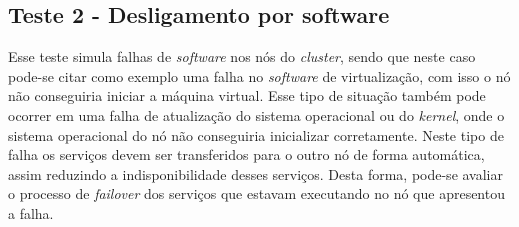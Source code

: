
% 


\subsection{Teste 2 - Desligamento por software}

Esse teste simula falhas de \textit{software} nos nós do \textit{cluster}, sendo que neste caso pode-se citar como exemplo uma falha no 
\textit{software} de virtualização, com isso o nó não conseguiria iniciar a máquina virtual. Esse tipo de situação também pode ocorrer em uma 
falha de atualização do sistema operacional ou do \textit{kernel}, onde o sistema operacional do nó não conseguiria inicializar corretamente.
Neste tipo de falha os serviços devem ser transferidos para o outro nó de forma automática, assim reduzindo a indisponibilidade desses serviços. 
Desta forma, pode-se avaliar o processo de \textit{failover} dos serviços que estavam executando no nó que apresentou a falha.

